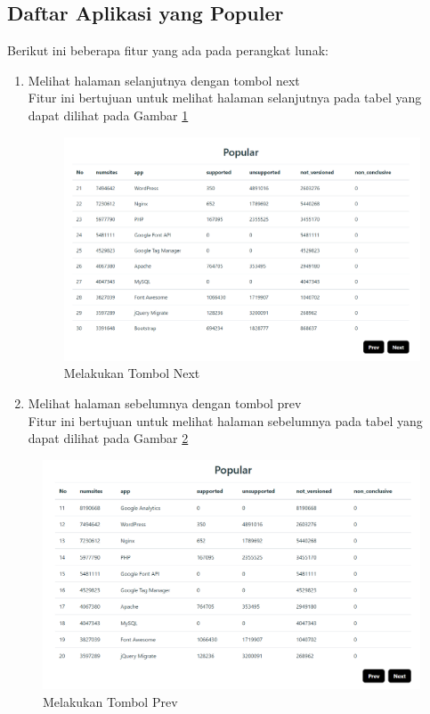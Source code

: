 \subsection{Daftar Aplikasi yang Populer}
Berikut ini beberapa fitur yang ada pada perangkat lunak:
\begin{enumerate}
	\item Melihat halaman selanjutnya dengan tombol next\\
	Fitur ini bertujuan untuk melihat halaman selanjutnya pada tabel yang dapat dilihat pada Gambar \ref{fig:popular_next}
	\begin{figure}[H]
		\centering  
		\includegraphics[scale=0.5]{Gambar/pengujian21.png}  
		\caption{Melakukan Tombol Next} 
		\label{fig:popular_next} 
	\end{figure}
	\item Melihat halaman sebelumnya dengan tombol prev\\
	Fitur ini bertujuan untuk melihat halaman sebelumnya pada tabel yang dapat dilihat pada Gambar \ref{fig:popular_prev}
\end{enumerate}
\begin{figure}[H]
	\centering  
	\includegraphics[scale=0.5]{Gambar/pengujian22.png}  
	\caption{Melakukan Tombol Prev} 
	\label{fig:popular_prev} 
\end{figure}